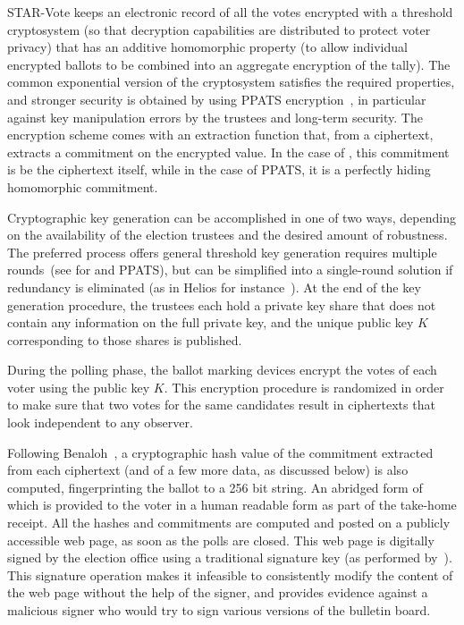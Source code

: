 STAR-Vote keeps an electronic record of all the votes encrypted with a
threshold cryptosystem (so that decryption capabilities are
distributed to protect voter privacy) that has an additive homomorphic
property (to allow individual encrypted ballots to be combined into an
aggregate encryption of the tally).  The common exponential version of
the \elgamal cryptosystem \cite{EG85} satisfies the required
properties, and stronger security is obtained by using PPATS
encryption~\cite{CPP13}, in particular against key manipulation errors
by the trustees and long-term security. The encryption scheme comes
with an extraction function \Ext that, from a ciphertext, extracts a
commitment on the encrypted value. In the case of \elgamal, this
commitment is be the ciphertext itself, while in the case of PPATS, it
is a perfectly hiding homomorphic commitment.

Cryptographic key generation can be accomplished in one of two ways,
depending on the availability of the election trustees and the desired
amount of robustness. The preferred process offers general threshold
key generation requires multiple rounds~(see \cite{GJKR07} for
\elgamal and PPATS), but can be simplified into a single-round
solution if redundancy is eliminated (as in Helios for
instance~\cite{adida09helios}).  At the end of the key generation
procedure, the trustees each hold a private key share that does not
contain any information on the full private key, and the unique public
key $K$ corresponding to those shares is published.

During the polling phase, the ballot marking devices encrypt the votes
of each voter using the public key $K$. This encryption procedure is
randomized in order to make sure that two votes for the same
candidates result in ciphertexts that look independent to any
observer. 

Following Benaloh~\cite{benaloh06simple}, a cryptographic hash value
of the commitment extracted from each ciphertext (and of a few more
data, as discussed below) is also computed, fingerprinting the ballot
to a 256 bit string. An abridged form of which is provided to the
voter in a human readable form as part of the take-home receipt. All
the hashes and commitments are computed and posted on a publicly
accessible web page, as soon as the polls are closed. This web page is
digitally signed by the election office using a traditional signature
key (as performed by~\cite{adida09helios}). This signature
operation makes it infeasible to consistently modify the content of
the web page without the help of the signer, and provides evidence
against a malicious signer who would try to sign various versions of
the bulletin board.

